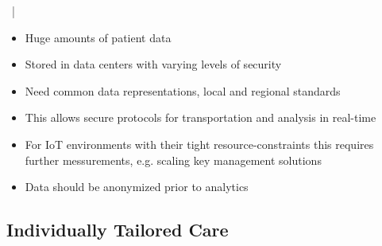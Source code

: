\documentclass[xcolor=dvipsnames, aspectratio=1610]{beamer}
\begin{document}
\begin{frame}{\secname\ | \subsecname}
    \begin{itemize}[<+->]
        \item Huge amounts of patient data \cite{gopal2019digital}
        \item Stored in data centers with varying levels of security \cite{patil2014big}
        \item Need common data representations, local and regional standards \cite{patil2014big}
        \item This allows secure protocols for transportation and analysis in real-time \cite{patil2014big}
        \item For IoT environments with their tight resource-constraints this requires further messurements, e.g. scaling key management solutions \cite{patil2014big}
        \item Data should be anonymized prior to analytics
    \end{itemize}
\end{frame}



\subsection{Individually Tailored Care}%
\label{sub:individually_tailored_care}
\end{document}
